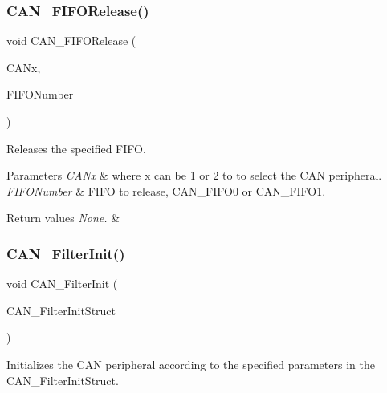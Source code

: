 \subsubsection{\texorpdfstring{CAN\_FIFORelease()}{CAN\_FIFORelease()}}
{\footnotesize\ttfamily void C\+A\+N\+\_\+\+F\+I\+F\+O\+Release (\begin{DoxyParamCaption}\item[{\mbox{\hyperlink{struct_c_a_n___type_def}{C\+A\+N\+\_\+\+Type\+Def}} $\ast$}]{C\+A\+Nx,  }\item[{uint8\+\_\+t}]{F\+I\+F\+O\+Number }\end{DoxyParamCaption})}



Releases the specified F\+I\+FO. 


\begin{DoxyParams}{Parameters}
{\em C\+A\+Nx} & where x can be 1 or 2 to to select the C\+AN peripheral. \\
\hline
{\em F\+I\+F\+O\+Number} & F\+I\+FO to release, C\+A\+N\+\_\+\+F\+I\+F\+O0 or C\+A\+N\+\_\+\+F\+I\+F\+O1. \\
\hline
\end{DoxyParams}

\begin{DoxyRetVals}{Return values}
{\em None.} & \\
\hline
\end{DoxyRetVals}
\mbox{\label{group___c_a_n___private___functions_ga39476830280340363c51041be6b12647}} 
\subsubsection{\texorpdfstring{CAN\_FilterInit()}{CAN\_FilterInit()}}
{\footnotesize\ttfamily void C\+A\+N\+\_\+\+Filter\+Init (\begin{DoxyParamCaption}\item[{\mbox{\hyperlink{struct_c_a_n___filter_init_type_def}{C\+A\+N\+\_\+\+Filter\+Init\+Type\+Def}} $\ast$}]{C\+A\+N\+\_\+\+Filter\+Init\+Struct }\end{DoxyParamCaption})}



Initializes the C\+AN peripheral according to the specified parameters in the C\+A\+N\+\_\+\+Filter\+Init\+Struct. 


